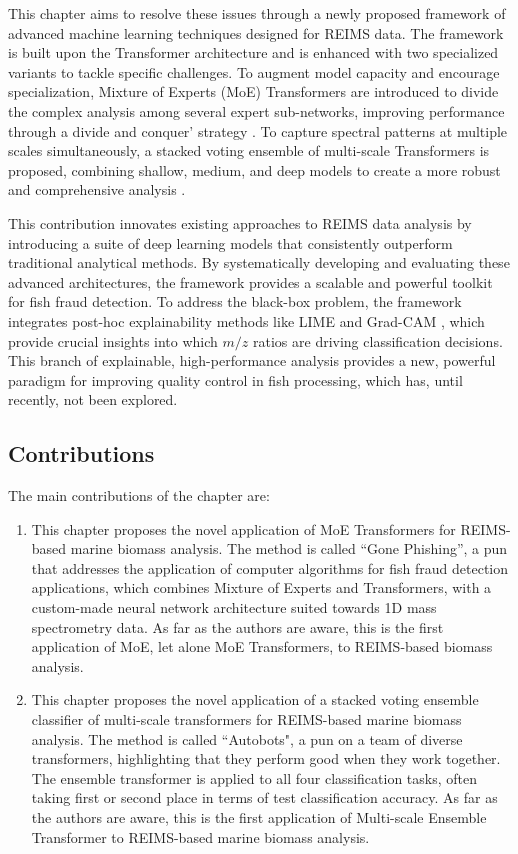 This chapter aims to resolve these issues through a newly proposed framework of advanced machine learning techniques designed for REIMS data. The framework is built upon the Transformer architecture \citep{Vaswani2017} and is enhanced with two specialized variants to tackle specific challenges. To augment model capacity and encourage specialization, Mixture of Experts (MoE) Transformers are introduced to divide the complex analysis among several expert sub-networks, improving performance through a divide and conquer’ strategy \citep{Jacobs1991,Kaiser2017}. To capture spectral patterns at multiple scales simultaneously, a stacked voting ensemble of multi-scale Transformers is proposed, combining shallow, medium, and deep models to create a more robust and comprehensive analysis \citep{Wolpert1992}.

This contribution innovates existing approaches to REIMS data analysis by introducing a suite of deep learning models that consistently outperform traditional analytical methods. By systematically developing and evaluating these advanced architectures, the framework provides a scalable and powerful toolkit for fish fraud detection. To address the black-box problem, the framework integrates post-hoc explainability methods like LIME \citep{Ribeiro2016} and Grad-CAM \citep{Selvaraju2017}, which provide crucial insights into which $m/z$ ratios are driving classification decisions. This branch of explainable, high-performance analysis provides a new, powerful paradigm for improving quality control in fish processing, which has, until recently, not been explored.


\subsection{Contributions}

The main contributions of the chapter are:

\begin{enumerate}
    \item This chapter proposes the novel application of MoE Transformers for REIMS-based marine biomass analysis. The method is called ``Gone Phishing'', a pun that addresses the application of computer algorithms for fish fraud detection applications, which combines Mixture of Experts and Transformers, with a custom-made neural network architecture suited towards 1D mass spectrometry data. As far as the authors are aware, this is the first application of MoE, let alone MoE Transformers, to REIMS-based biomass analysis.
    \item This chapter proposes the novel application of a stacked voting ensemble classifier of multi-scale transformers for REIMS-based marine biomass analysis. The method is called ``Autobots", a pun on a team of diverse transformers, highlighting that they perform good when they work together. The ensemble transformer is applied to all four classification tasks, often taking first or second place in terms of test classification accuracy. As far as the authors are aware, this is the first application of Multi-scale Ensemble Transformer to REIMS-based marine biomass analysis.
\end{enumerate}


